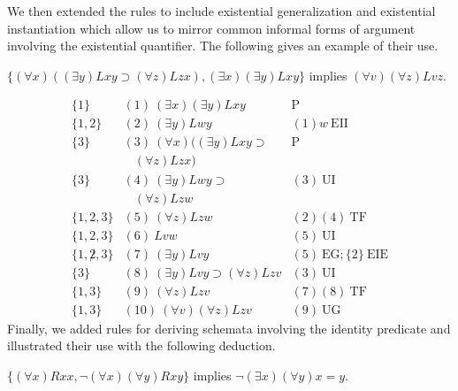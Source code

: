 \iffalse
We then extended the rules to include existential generalization and existential instantiation which allow us to mirror common informal forms of argument involving the existential quantifier. The following gives an example of their use.
\begin{center}
$\{(\forall x) ((\exists y) Lxy \supset (\forall z) Lzx), (\exists x)(\exists
y) Lxy \}$ implies $(\forall v)(\forall z) Lvz.$
\end{center}
\[
\begin{array}{lll}
\{1\}   & (1)\  (\exists x)(\exists y) Lxy &  \mathrm{P}\\
\{1,2\}   & (2)\ (\exists y) Lwy  & (1)w\ \mathrm{EII}\\
\{3\}   & (3)\ (\forall x) ((\exists y) Lxy \supset   & 
\mathrm{P}\\
  &\ \ \ \  (\forall z) Lzx)  & \\
\{3\}   & (4)\ (\exists y) Lwy \supset   & (3)\ \mathrm{UI}\\
  &\ \ \ \ (\forall z) Lzw & \\
\{1,2,3\}   & (5)\ (\forall z) Lzw  & (2)(4)\ \mathrm{TF}\\
\{1,2,3\}   & (6)\ Lvw  & (5)\ \mathrm{UI}\\
\{1,\not 2,3\}   & (7)\ (\exists y) Lvy  & (5)\ \mathrm{EG};\{2\}\
\mathrm{EIE}\\ 
\{3\}   & (8)\ (\exists y) Lvy \supset (\forall z) Lzv  & (3)\ \mathrm{UI}\\
\{1,3\}   & (9)\  (\forall z) Lzv & (7)(8)\ \mathrm{TF}\\
\{1,3\}   & (10)\  (\forall v)(\forall z) Lzv & (9)\ \mathrm{UG}
\end{array}
\]
\newpage
Finally, we added rules for deriving schemata involving the identity predicate and illustrated their use with the following deduction.
\begin{center}
$\{(\forall x) Rxx, \neg (\forall x)(\forall y) Rxy \}$
implies $\neg (\exists x)(\forall y) x = y$.
\end{center}
